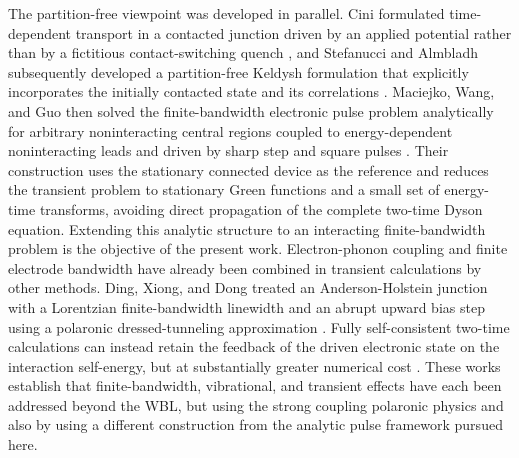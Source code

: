 \documentclass[
 reprint,
 superscriptaddress,
 amsmath,amssymb,
 aps,prb,
 longbibliography,
 floatfix
]{revtex4-2}
\begin{document}
The partition-free viewpoint was developed in parallel. Cini formulated time-dependent transport in a contacted junction driven by an applied potential rather than by a fictitious contact-switching quench \cite{Cini1980}, and Stefanucci and Almbladh subsequently developed a partition-free Keldysh formulation that explicitly incorporates the initially contacted state and its correlations \cite{StefanucciAlmbladh2004}. Maciejko, Wang, and Guo then solved the finite-bandwidth electronic pulse problem analytically for arbitrary noninteracting central regions coupled to energy-dependent noninteracting leads and driven by sharp step and square pulses \cite{MaciejkoWangGuo2006}. Their construction uses the stationary connected device as the reference and reduces the transient problem to stationary Green functions and a small set of energy-time transforms, avoiding direct propagation of the complete two-time Dyson equation. Extending this analytic structure to an interacting finite-bandwidth problem is the objective of the present work. \newline
Electron-phonon coupling and finite electrode bandwidth have already been combined in transient calculations by other methods. Ding, Xiong, and Dong treated an Anderson-Holstein junction with a Lorentzian finite-bandwidth linewidth and an abrupt upward bias step using a polaronic dressed-tunneling approximation \cite{DingXiongDong2016}. Fully self-consistent two-time calculations can instead retain the feedback of the driven electronic state on the interaction self-energy, but at substantially greater numerical cost \cite{MyohanenEtAl2009,SeoaneSoutoEtAl2018,RidleyEtAl2022}. These works establish that finite-bandwidth, vibrational, and transient effects have each been addressed beyond the WBL, but using the strong coupling polaronic physics and also by using a different construction  from the analytic pulse framework pursued here. \newline
\end{document}
